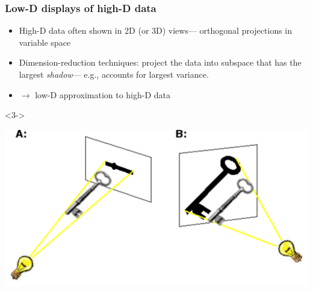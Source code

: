 \renewcommand{\FileName}{projection}

\begin{frame}
  \frametitle{Low-D displays of high-D data}
 \begin{itemize}
 \item<1-> High-D data often shown in 2D (or 3D) views--- orthogonal projections in variable space 
 \item<2-> Dimension-reduction techniques: project the data into subspace that has
the largest \emph{shadow}--- e.g., accounts for largest variance.
 \item<3-> $\rightarrow$ low-D approximation to high-D data
\end{itemize}

\begin{uncoverenv}<3->
 \begin{center}
  \includegraphics[height=.5\textheight,clip]{fig/projection2}
  \\ 
 \end{center}
\end{uncoverenv}
\end{frame}

